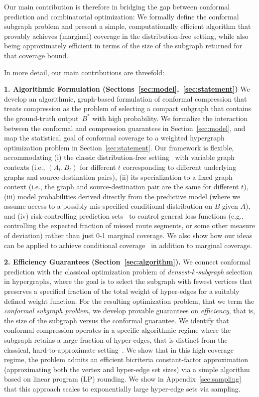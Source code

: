 Our main contribution is therefore in bridging the gap between conformal prediction and combinatorial optimization: We formally define the conformal subgraph problem and present a simple, computationally efficient algorithm that provably achieves (marginal) coverage in the distribution-free setting, while also being approximately efficient in terms of the size of the subgraph returned for that coverage bound.

In more detail, our main contributions are threefold:

\textbf{1. Algorithmic Formulation (Sections~\ref{sec:model},~\ref{sec:statement})} 
We develop an algorithmic, graph-based formulation of conformal compression that treats compression as the problem of selecting a compact subgraph  that contains the ground-truth output~$B^*$ with high probability.  We formalize the interaction between the conformal and compression guarantees in Section~\ref{sec:model}, and map the statistical goal of conformal coverage to a weighted hypergraph optimization problem in Section~\ref{sec:statement}. Our framework is flexible, accommodating (i) the classic distribution-free setting~\cite{vovk2005algorithmic} with variable graph contexts (i.e., $(A_t,B_t)$ for different $t$ corresponding to different underlying graphs and source-destination pairs), (ii) its specialization to a fixed graph context (i.e., the graph and source-destination pair are the same for different $t$), (iii) model probabilities derived directly from the predictive model \cite{angelopoulos2022learntestcalibratingpredictive,zhang2025conformalstructuredprediction} (where we assume access to a possibly mis-specified conditional distribution on $B$ given $A$), and (iv) risk-controlling prediction sets~\cite{Risk} to control general loss functions (e.g., controlling the expected fraction of missed route segments, or some other measure of deviation) rather than just 0-1 marginal coverage. We also show how our ideas can be applied to achieve conditional coverage~\cite{pmlr-v25-vovk12} in addition to marginal coverage.

\textbf{2. Efficiency Guarantees (Section~\ref{sec:algorithm}).} 
We connect conformal prediction with the classical optimization problem of \emph{densest-$k$-subgraph} selection in hypergraphs, where the goal is to select the subgraph with fewest vertices that preserves a specified fraction of the total weight of hyper-edges for a suitably defined weight function. For the resulting optimization problem, that we term the {\em conformal subgraph problem}, we develop provable guarantees on {\em efficiency}, that is, the size of the subgraph versus the conformal guarantee. We identify that conformal compression operates in a specific algorithmic regime where the subgraph retains a large fraction of hyper-edges, that is distinct from the classical, hard-to-approximate setting~\cite{bhaskara2010dks,feige2001dense,manurangsi2017hardness}. We show that in this high-coverage regime, the problem admits an efficient bicriteria constant-factor approximation (approximating both the vertex and hyper-edge set sizes) via a simple algorithm based on linear program (LP) rounding. We show in Appendix~\ref{sec:sampling} that this approach scales to exponentially large hyper-edge sets via sampling. 


